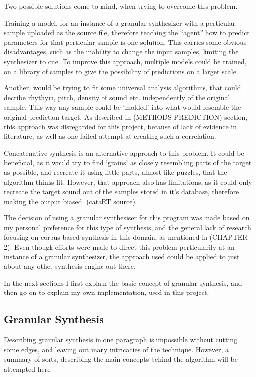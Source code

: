 Two possible solutions come to mind, when trying to overcome this
problem.

Training a model, for an instance of a granular synthesizer with a
perticular sample uploaded as the source file, therefore teaching the
``agent'' how to predict parameters for that perticular sample is one
solution. This carries some obvious disadvantages, such as the
inability to change the input samples, limiting the synthesizer to
one. To improve this approach, multiple models could be trained, on a
library of samples to give the possibility of predictions on a larger
scale.

Another, would be trying to fit some universal analysis algorithms,
that could decribe rhythym, pitch, density of sound etc. independently
of the original sample. This way any sample could be `molded' into
what would resemble the original prediction target. As described in
(METHODS-PREDICTION) section, this approach was disregarded for this
project, because of lack of evidence in literature, as well as one
failed attempt at creating such a correlation. 

Concatenative synthesis is an alternative approach to this problem. It
could be beneficial, as it would try to find `grains' as closely
resembling parts of the target as possible, and recreate it using
little parts, almost like puzzles, that the algorithm thinks
fit. However, that approach also has limitations, as it could only
recreate the target sound out of the samples stored in it's database,
therefore making the output biased. (cataRT source)

The decision of using a granular synthesiser for this program was made
based on my personal preference for this type of synthesis, and the
general lack of research focusing on corpus-based synthesis in this
domain, as mentioned in (CHAPTER 2). Even though efforts were made to
direct this problem perticularily at an instance of a granular
synthesizer, the approach used could be applied to just about any
other synthesis engine out there.

In the next sections I first explain the basic concept of granular
synthesis, and then go on to explain my own implementation, used in
this project.

\subsection{Granular Synthesis}

Describing granular synthesis in one paragraph is impossible
without cutting some edges, and leaving out many intricacies of the
technique. However, a summary of sorts, describing the main concepts
behind the algorithm will be attempted here. 

